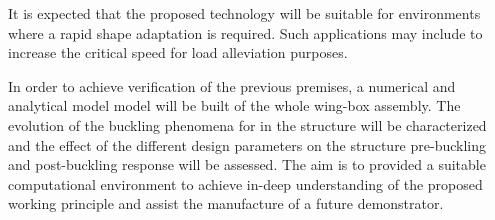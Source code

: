   It is expected that the proposed technology will be suitable for environments where a rapid shape adaptation is required. Such applications may include to increase the critical speed for load alleviation purposes.

  In order to achieve verification of the previous premises, a numerical and analytical model model will be built of the whole wing-box assembly. The evolution of the buckling phenomena for in the structure will be characterized and the effect of the different design parameters on the structure pre-buckling and post-buckling response will be assessed. The aim is to provided a suitable computational environment to achieve in-deep understanding of the proposed working principle and assist the manufacture of a future demonstrator.
